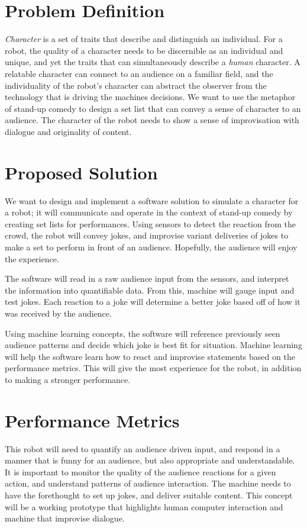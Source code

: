 \documentclass[onecolumn, draftclsnofoot,10pt, compsoc]{IEEEtran}
\begin{document}
\section{Problem Definition}
{\it{Character}} is a set of traits that describe and distinguish an individual. For a robot, the quality of a character needs to be discernible as an individual and unique, and yet the traits that can simultaneously describe a {\it{human}} character.
A relatable character can connect to an audience on a familiar field, and the individuality of the robot's character can abstract the observer from the technology that is driving the machines decisions.
We want to use the metaphor of stand-up comedy to design a set list that can convey a sense of character to an audience. The character of the robot needs to show a sense of improvisation with dialogue and originality of content.
\section{Proposed Solution}

We want to design and implement a software solution to simulate a character for a robot; it will communicate and operate in the context of stand-up comedy by creating set lists for performances.
Using sensors to detect the reaction from the crowd, the robot will convey jokes, and improvise variant deliveries of jokes to make a set to perform in front of an audience. Hopefully, the audience will enjoy the experience.

The software will read in a raw audience input from the sensors, and interpret the information into quantifiable data. From this, machine will gauge input and test jokes. Each reaction to a joke will determine a better joke based off of how it was received by the audience.

Using machine learning concepts, the software will reference previously seen audience patterns and decide which joke is best fit for situation. Machine learning will help the software learn how to react and improvise statements based on the performance metrics.
This will give the most experience for the robot, in addition to making a stronger performance.
\section{Performance Metrics}

This robot will need to quantify an audience driven input, and respond in a manner that is funny for an audience, but also appropriate and understandable. It is important to monitor the quality of the audience reactions for a given action, and understand patterns of audience interaction. The machine needs to have the forethought to set up jokes, and deliver suitable content. This concept will be a working prototype that highlights human computer interaction and machine that improvise dialogue.
\end{document}
